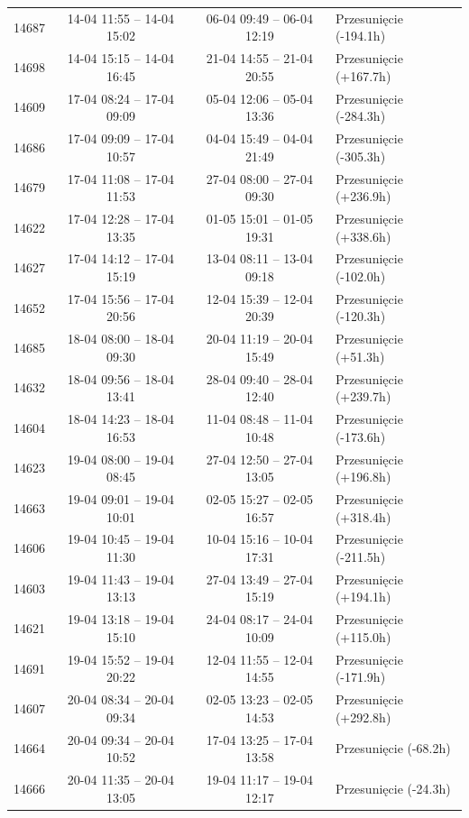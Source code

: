 \begin{table}[htbp]
\begin{tabular}{|r|c|c|l|}
14687 & 14-04 11:55 -- 14-04 15:02 & 06-04 09:49 -- 06-04 12:19 & Przesunięcie (-194.1h) \\ 
14698 & 14-04 15:15 -- 14-04 16:45 & 21-04 14:55 -- 21-04 20:55 & Przesunięcie (+167.7h) \\ 
14609 & 17-04 08:24 -- 17-04 09:09 & 05-04 12:06 -- 05-04 13:36 & Przesunięcie (-284.3h) \\ 
14686 & 17-04 09:09 -- 17-04 10:57 & 04-04 15:49 -- 04-04 21:49 & Przesunięcie (-305.3h) \\ 
14679 & 17-04 11:08 -- 17-04 11:53 & 27-04 08:00 -- 27-04 09:30 & Przesunięcie (+236.9h) \\ 
14622 & 17-04 12:28 -- 17-04 13:35 & 01-05 15:01 -- 01-05 19:31 & Przesunięcie (+338.6h) \\ 
14627 & 17-04 14:12 -- 17-04 15:19 & 13-04 08:11 -- 13-04 09:18 & Przesunięcie (-102.0h) \\ 
14652 & 17-04 15:56 -- 17-04 20:56 & 12-04 15:39 -- 12-04 20:39 & Przesunięcie (-120.3h) \\ 
14685 & 18-04 08:00 -- 18-04 09:30 & 20-04 11:19 -- 20-04 15:49 & Przesunięcie (+51.3h) \\ 
14632 & 18-04 09:56 -- 18-04 13:41 & 28-04 09:40 -- 28-04 12:40 & Przesunięcie (+239.7h) \\ 
14604 & 18-04 14:23 -- 18-04 16:53 & 11-04 08:48 -- 11-04 10:48 & Przesunięcie (-173.6h) \\ 
14623 & 19-04 08:00 -- 19-04 08:45 & 27-04 12:50 -- 27-04 13:05 & Przesunięcie (+196.8h) \\ 
14663 & 19-04 09:01 -- 19-04 10:01 & 02-05 15:27 -- 02-05 16:57 & Przesunięcie (+318.4h) \\ 
14606 & 19-04 10:45 -- 19-04 11:30 & 10-04 15:16 -- 10-04 17:31 & Przesunięcie (-211.5h) \\ 
14603 & 19-04 11:43 -- 19-04 13:13 & 27-04 13:49 -- 27-04 15:19 & Przesunięcie (+194.1h) \\ 
14621 & 19-04 13:18 -- 19-04 15:10 & 24-04 08:17 -- 24-04 10:09 & Przesunięcie (+115.0h) \\ 
14691 & 19-04 15:52 -- 19-04 20:22 & 12-04 11:55 -- 12-04 14:55 & Przesunięcie (-171.9h) \\ 
14607 & 20-04 08:34 -- 20-04 09:34 & 02-05 13:23 -- 02-05 14:53 & Przesunięcie (+292.8h) \\ 
14664 & 20-04 09:34 -- 20-04 10:52 & 17-04 13:25 -- 17-04 13:58 & Przesunięcie (-68.2h) \\ 
14666 & 20-04 11:35 -- 20-04 13:05 & 19-04 11:17 -- 19-04 12:17 & Przesunięcie (-24.3h) \\ 

\end{tabular}
\end{table}
